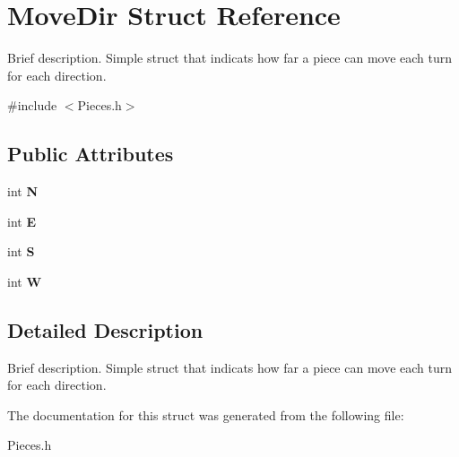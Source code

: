 \hypertarget{struct_move_dir}{\section{Move\-Dir Struct Reference}
\label{struct_move_dir}
}


Brief description. Simple struct that indicats how far a piece can move each turn for each direction.  




{\ttfamily \#include $<$Pieces.\-h$>$}

\subsection*{Public Attributes}
\begin{DoxyCompactItemize}
\item 
\hypertarget{struct_move_dir_abf2617e5000f6d25e8dfe0d9cb41d5ab}{int {\bfseries N}}\label{struct_move_dir_abf2617e5000f6d25e8dfe0d9cb41d5ab}

\item 
\hypertarget{struct_move_dir_a2373da17371963eab23101b4eef0d40e}{int {\bfseries E}}\label{struct_move_dir_a2373da17371963eab23101b4eef0d40e}

\item 
\hypertarget{struct_move_dir_a02ef68f2e799daf66a82a0d9318fc2fb}{int {\bfseries S}}\label{struct_move_dir_a02ef68f2e799daf66a82a0d9318fc2fb}

\item 
\hypertarget{struct_move_dir_ae7d3fc3e4f692079d3848bff650f6edd}{int {\bfseries W}}\label{struct_move_dir_ae7d3fc3e4f692079d3848bff650f6edd}

\end{DoxyCompactItemize}


\subsection{Detailed Description}
Brief description. Simple struct that indicats how far a piece can move each turn for each direction. 

The documentation for this struct was generated from the following file\-:\begin{DoxyCompactItemize}
\item 
Pieces.\-h\end{DoxyCompactItemize}
